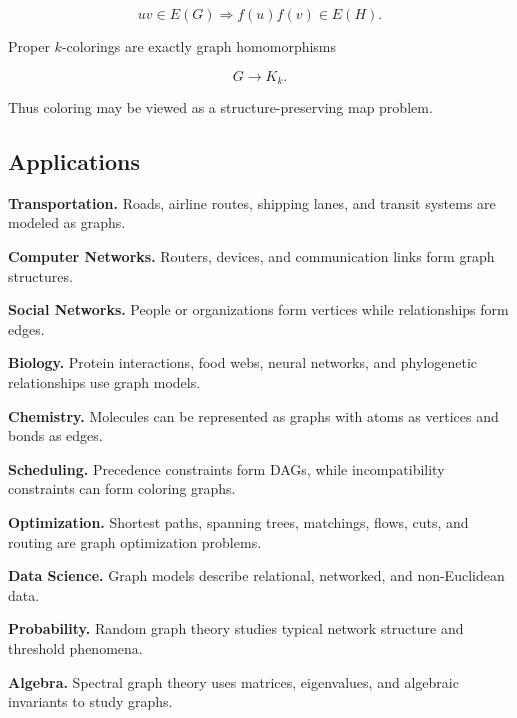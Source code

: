 \[
\boxed{
uv\in E(G)
\Longrightarrow
f(u)f(v)\in E(H).
}
\]

Proper \(k\)-colorings are exactly graph homomorphisms

\[
G\to K_k.
\]

Thus coloring may be viewed as a structure-preserving map problem.

\subsection{Applications}
\label{subsec:graph-theory-applications}

\begin{applicationbox}

\textbf{Transportation.}
Roads, airline routes, shipping lanes, and transit systems are modeled
as graphs.

\medskip

\textbf{Computer Networks.}
Routers, devices, and communication links form graph structures.

\medskip

\textbf{Social Networks.}
People or organizations form vertices while relationships form edges.

\medskip

\textbf{Biology.}
Protein interactions, food webs, neural networks, and phylogenetic
relationships use graph models.

\medskip

\textbf{Chemistry.}
Molecules can be represented as graphs with atoms as vertices and bonds
as edges.

\medskip

\textbf{Scheduling.}
Precedence constraints form DAGs, while incompatibility constraints can
form coloring graphs.

\medskip

\textbf{Optimization.}
Shortest paths, spanning trees, matchings, flows, cuts, and routing are
graph optimization problems.

\medskip

\textbf{Data Science.}
Graph models describe relational, networked, and non-Euclidean data.

\medskip

\textbf{Probability.}
Random graph theory studies typical network structure and threshold
phenomena.

\medskip

\textbf{Algebra.}
Spectral graph theory uses matrices, eigenvalues, and algebraic
invariants to study graphs.

\end{applicationbox}

